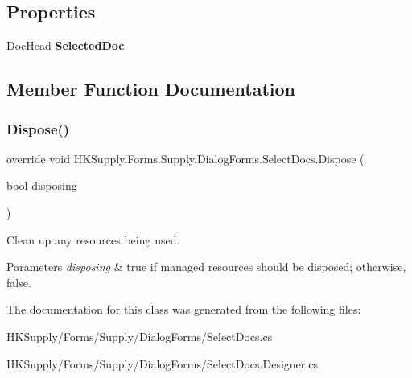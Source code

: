 \subsection*{Properties}
\begin{DoxyCompactItemize}
\item 
\mbox{\label{class_h_k_supply_1_1_forms_1_1_supply_1_1_dialog_forms_1_1_select_docs_ac661b86a665a0ecad8805ab3f6a3a32c}} 
\mbox{\hyperlink{class_h_k_supply_1_1_models_1_1_supply_1_1_doc_head}{Doc\+Head}} {\bfseries Selected\+Doc}
\end{DoxyCompactItemize}


\subsection{Member Function Documentation}
\mbox{\label{class_h_k_supply_1_1_forms_1_1_supply_1_1_dialog_forms_1_1_select_docs_a423e6dcbeea397645b09a00db21952a4}} 
\subsubsection{\texorpdfstring{Dispose()}{Dispose()}}
{\footnotesize\ttfamily override void H\+K\+Supply.\+Forms.\+Supply.\+Dialog\+Forms.\+Select\+Docs.\+Dispose (\begin{DoxyParamCaption}\item[{bool}]{disposing }\end{DoxyParamCaption})\hspace{0.3cm}{\ttfamily [protected]}}



Clean up any resources being used. 


\begin{DoxyParams}{Parameters}
{\em disposing} & true if managed resources should be disposed; otherwise, false.\\
\hline
\end{DoxyParams}


The documentation for this class was generated from the following files\+:\begin{DoxyCompactItemize}
\item 
H\+K\+Supply/\+Forms/\+Supply/\+Dialog\+Forms/Select\+Docs.\+cs\item 
H\+K\+Supply/\+Forms/\+Supply/\+Dialog\+Forms/Select\+Docs.\+Designer.\+cs\end{DoxyCompactItemize}
